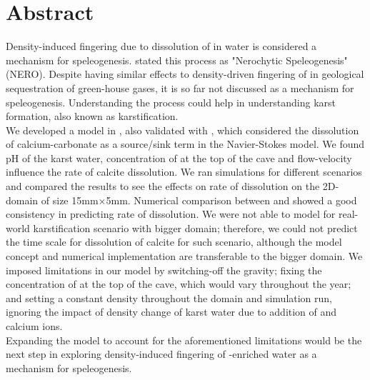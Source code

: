 \chapter*{Abstract}
\thispagestyle{empty}
Density-induced fingering due to dissolution of  in water is considered a mechanism for speleogenesis. \citet{Scherzer2017} stated this process as "Nerochytic Speleogenesis" (NERO). Despite having similar effects to density-driven fingering of  in geological sequestration of green-house gases, it is so far not discussed as a mechanism for speleogenesis. Understanding the process could help in understanding karst formation, also known as karstification.\\

We developed a model in \DuMuX, also validated with \MATLAB, which considered the dissolution of calcium-carbonate as a source/sink term in the Navier-Stokes model. We found pH of the karst water, concentration of  at the top of the cave and flow-velocity influence the rate of calcite dissolution. We ran simulations for different scenarios and compared the results to see the effects on rate of dissolution on the 2D-domain of  size 15mm$\times$5mm. Numerical comparison between \DuMuX and \MATLAB showed a good consistency in predicting rate of dissolution. We were not able to model for real-world karstification scenario with bigger domain; therefore, we could not predict the time scale for dissolution of calcite for such scenario, although the model concept and numerical implementation are transferable to the bigger domain. We imposed limitations in our model by switching-off the gravity; fixing the concentration of  at the top of the cave, which would vary throughout the year; and setting a constant density throughout the domain and simulation run, ignoring the impact of density change of karst water due to addition of  and calcium ions.\\

Expanding the model to account for the aforementioned limitations would be the next step in exploring density-induced fingering of -enriched water as a mechanism for speleogenesis.

\endinput